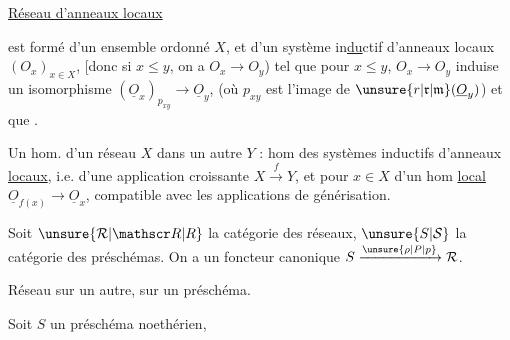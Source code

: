 \uline{Réseau d'anneaux locaux}

est formé d'un ensemble ordonné $X$, et  d'un système in\uline{du}ctif d'anneaux locaux $(O_x)_{x\in X}$, [donc si $x\leq y$, on a $O_x\to O_y$) tel que pour $x\leq y$, $O_x\to O_y$ induise un isomorphisme $(\underline{O}_x)_{p_{xy}}\to\underline{O}_y$, (où $p_{xy}$ est l'image  de $\unsure{r|\mathfrak{r}|\mathfrak{m}}(\underline{O}_y)$) et que  .

Un hom. d'un réseau $X$ dans un autre $Y$ : hom des systèmes inductifs d'anneaux \uline{locaux}, i.e.  d'une application  croissante $X\xrightarrow{f}Y$, et pour  $x\in X$ d'un hom \uline{local} $\underline{O}_{f(x)}\to\underline{O}_x$, compatible avec les applications de  générisation.

Soit $\unsure{\mathcal R|\mathscr R|R}$ la catégorie des réseaux, $\unsure{S|\mathcal S}$ la catégorie des préschémas. On a un foncteur canonique $S\xrightarrow{\unsure{\rho|P|p}}\mathcal R$.

Réseau sur un autre, sur un préschéma.

Soit $S$ un préschéma  noethérien,
